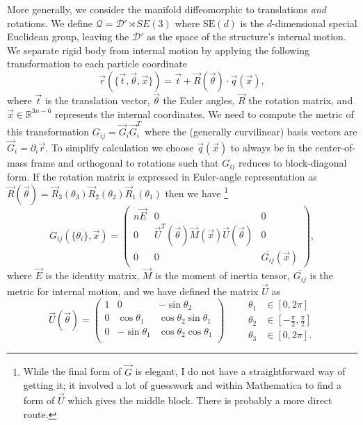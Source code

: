\documentclass[11pt,twoside]{report}
\begin{document}
More generally, we consider the manifold diffeomorphic to translations \emph{and} rotations.
We define $\mathcal{Q} = \mathcal{D}' \rtimes SE(3)$ where $\textrm{SE}(d)$ is the $d$-dimensional special Euclidean group, leaving the $\mathcal{D}'$ as the space of the structure's internal motion.
We separate rigid body from internal motion by applying the following transformation to each particle coordinate
\begin{equation}
  \vec{r}(\{\vec{t}, \vec{\theta}, \vec{x}\}) =
  \vec{t} + \vec{R}(\vec{\theta}) \cdot \vec{q}(\vec{x}),
\end{equation}
where $\vec{t}$ is the translation vector, $\vec{\theta}$ the Euler angles, $\vec{R}$ the rotation matrix, and $\vec{x} \in \mathbb{R}^{3n-6}$ represents the internal coordinates.
We need to compute the metric of this transformation $G_{ij} = \vec{G}_i \vec{G}_i^T$ where the (generally curvilinear) basis vectors are $\vec{G}_i = \partial_i \vec{r}$.
To simplify calculation we choose $\vec{q}(\vec{x})$ to always be in the center-of-mass frame and orthogonal to rotations such that $G_{ij}$ reduces to block-diagonal form.
If the rotation matrix is expressed in Euler-angle representation as $\vec{R}(\vec{\theta}) = \vec{R}_3(\theta_3) \vec{R}_2(\theta_2) \vec{R}_1(\theta_1)$ then we have%
\footnote{While the final form of $\vec{G}$ is elegant, I do not have a straightforward way of getting it; it involved a lot of guesswork and within Mathematica to find a form of $\vec{U}$ which gives the middle block.
  There is probably a more direct route.}
\begin{equation}
  G_{ij}(\{\theta_i\}, \vec{x}) =
  \begin{pmatrix}
    n \vec{E} & 0 & 0 \\
    0 & \vec{U}^T(\vec{\theta}) \vec{M}(\vec{x}) \vec{U}(\vec{\theta}) & 0 \\
    0 & 0 & \overline{G_{ij}}(\vec{x})
  \end{pmatrix},
\end{equation}
where $\vec{E}$ is the identity matrix, $\vec{M}$ is the moment of inertia tensor, $\overline{G_{ij}}$ is the metric for internal motion, and we have defined the matrix $\vec{U}$ as
\begin{equation}
  \vec{U}(\vec{\theta}) =
  \begin{pmatrix}
    1 &  0              & -\sin{\theta_2} \\
    0 &  \cos{\theta_1} &  \cos{\theta_2} \sin{\theta_1} \\
    0 & -\sin{\theta_1} &  \cos{\theta_2} \cos{\theta_1} \\
  \end{pmatrix}
  \qquad
  \begin{aligned}
    \theta_1 &\in [0,2\pi] \\
    \theta_2 &\in \left[-\frac{\pi}{2},\frac{\pi}{2}\right] \\
    \theta_3 &\in [0,2\pi].
  \end{aligned}
\end{equation}
\end{document}
